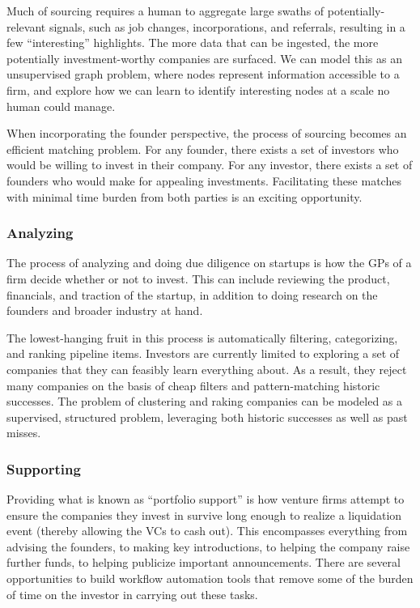 Much of sourcing requires a human to aggregate large swaths of potentially-relevant signals, such as job changes, incorporations, and referrals, resulting in a few ``interesting'' highlights. The more data that can be ingested, the more potentially investment-worthy companies are surfaced. We can model this as an unsupervised graph problem, where nodes represent information accessible to a firm, and explore how we can learn to identify interesting nodes at a scale no human could manage.

When incorporating the founder perspective, the process of sourcing becomes an efficient matching problem. For any founder, there exists a set of investors who would be willing to invest in their company. For any investor, there exists a set of founders who would make for appealing investments. Facilitating these matches with minimal time burden from both parties is an exciting opportunity.

\subsubsection{Analyzing}

The process of analyzing and doing due diligence on startups is how the GPs of a firm decide whether or not to invest. This can include reviewing the product, financials, and traction of the startup, in addition to doing research on the founders and broader industry at hand.

The lowest-hanging fruit in this process is automatically filtering, categorizing, and ranking pipeline items. Investors are currently limited to exploring a set of companies that they can feasibly learn everything about. As a result, they reject many companies on the basis of cheap filters and pattern-matching historic successes. The problem of clustering and raking companies can be modeled as a supervised, structured problem, leveraging both historic successes as well as past misses.

\subsubsection{Supporting}

Providing what is known as ``portfolio support'' is how venture firms attempt to ensure the companies they invest in survive long enough to realize a liquidation event (thereby allowing the VCs to cash out). This encompasses everything from advising the founders, to making key introductions, to helping the company raise further funds, to helping publicize important announcements. There are several opportunities to build workflow automation tools that remove some of the burden of time on the investor in carrying out these tasks.

